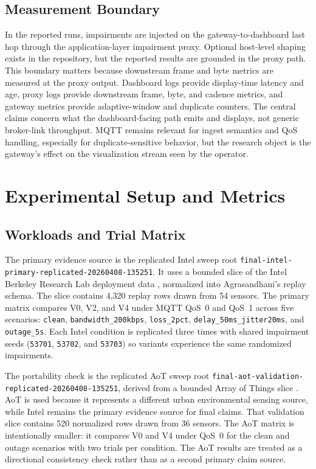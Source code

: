 \documentclass[sigconf,authorversion,nonacm]{acmart}
\begin{document}
\subsection{Measurement Boundary}

In the reported runs, impairments are injected on the gateway-to-dashboard last hop through the application-layer impairment proxy. Optional host-level shaping exists in the repository, but the reported results are grounded in the proxy path. This boundary matters because downstream frame and byte metrics are measured at the proxy output. Dashboard logs provide display-time latency and age, proxy logs provide downstream frame, byte, and cadence metrics, and gateway metrics provide adaptive-window and duplicate counters. The central claims concern what the dashboard-facing path emits and displays, not generic broker-link throughput. MQTT remains relevant for ingest semantics and QoS handling, especially for duplicate-sensitive behavior, but the research object is the gateway's effect on the visualization stream seen by the operator.

\section{Experimental Setup and Metrics}

\subsection{Workloads and Trial Matrix}

The primary evidence source is the replicated Intel sweep root \nolinkurl{final-intel-primary-replicated-20260408-135251}. It uses a bounded slice of the Intel Berkeley Research Lab deployment data \cite{intelLabData}, normalized into Agrasandhani's replay schema. The slice contains 4{,}320 replay rows drawn from 54 sensors. The primary matrix compares V0, V2, and V4 under MQTT QoS~0 and QoS~1 across five scenarios: \nolinkurl{clean}, \nolinkurl{bandwidth_200kbps}, \nolinkurl{loss_2pct}, \nolinkurl{delay_50ms_jitter20ms}, and \nolinkurl{outage_5s}. Each Intel condition is replicated three times with shared impairment seeds (\nolinkurl{53701}, \nolinkurl{53702}, and \nolinkurl{53703}) so variants experience the same randomized impairments.

The portability check is the replicated AoT sweep root \nolinkurl{final-aot-validation-replicated-20260408-135251}, derived from a bounded Array of Things slice \cite{aotCyberGIS}. AoT is used because it represents a different urban environmental sensing source, while Intel remains the primary evidence source for final claims. That validation slice contains 520 normalized rows drawn from 36 sensors. The AoT matrix is intentionally smaller: it compares V0 and V4 under QoS~0 for the clean and outage scenarios with two trials per condition. The AoT results are treated as a directional consistency check rather than as a second primary claim source.
\end{document}
